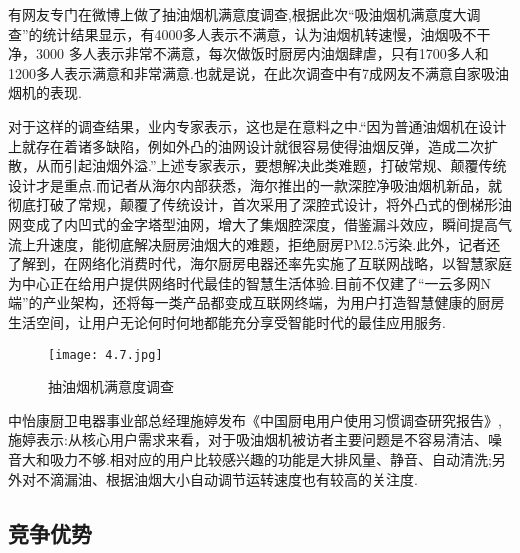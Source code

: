 \begin{enumerate}
      有网友专门在微博上做了抽油烟机满意度调查,根据此次“吸油烟机满意度大调查”的统计结果显示，有4000多人表示不满意，认为油烟机转速慢，油烟吸不干净，3000 多人表示非常不满意，每次做饭时厨房内油烟肆虐，只有1700多人和1200多人表示满意和非常满意.也就是说，在此次调查中有7成网友不满意自家吸油烟机的表现.

      对于这样的调查结果，业内专家表示，这也是在意料之中.“因为普通油烟机在设计上就存在着诸多缺陷，例如外凸的油网设计就很容易使得油烟反弹，造成二次扩散，从而引起油烟外溢.”上述专家表示，要想解决此类难题，打破常规、颠覆传统设计才是重点.而记者从海尔内部获悉，海尔推出的一款深腔净吸油烟机新品，就彻底打破了常规，颠覆了传统设计，首次采用了深腔式设计，将外凸式的倒梯形油网变成了内凹式的金字塔型油网，增大了集烟腔深度，借鉴漏斗效应，瞬间提高气流上升速度，能彻底解决厨房油烟大的难题，拒绝厨房PM2.5污染.此外，记者还了解到，在网络化消费时代，海尔厨房电器还率先实施了互联网战略，以智慧家庭为中心正在给用户提供网络时代最佳的智慧生活体验.目前不仅建了“一云多网N端”的产业架构，还将每一类产品都变成互联网终端，为用户打造智慧健康的厨房生活空间，让用户无论何时何地都能充分享受智能时代的最佳应用服务.

      \begin{figure}[H]
      \centering
      \texttt{[image: 4.7.jpg]}
      \caption{抽油烟机满意度调查}
      \label{抽油烟机满意度调查}
      \end{figure}

      中怡康厨卫电器事业部总经理施婷发布《中国厨电用户使用习惯调查研究报告》,施婷表示:从核心用户需求来看，对于吸油烟机被访者主要问题是不容易清洁、噪音大和吸力不够.相对应的用户比较感兴趣的功能是大排风量、静音、自动清洗;另外对不滴漏油、根据油烟大小自动调节运转速度也有较高的关注度.

\end{enumerate}

\subsection{竞争优势}

